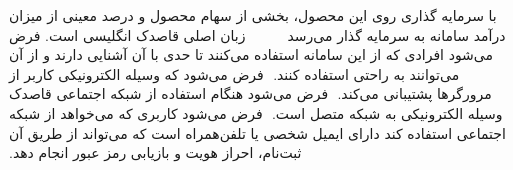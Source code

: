 ‫
‫  
‫ با سرمایه گذاری روی این محصول، بخشی از سهام محصول و درصد معینی از میزان درآمد سامانه به سرمایه گذار می‌رسد
‫
‫
‫
‫
‫
‫
‫
‫
‫ زبان اصلی قاصدک انگلیسی است. فرض می‌شود افرادی که از این سامانه استفاده می‌کنند تا حدی با آن آشنایی دارند و از آن می‌توانند به راحتی استفاده کنند.
‫
‫ فرض می‌شود که وسیله الکترونیکی کاربر از مرورگر‌ها پشتیبانی می‌کند.
‫
‫ فرض می‌شود هنگام استفاده از شبکه اجتماعی قاصدک وسیله الکترونیکی به شبکه متصل است.
‫
‫ فرض می‌شود کاربری که می‌خواهد از شبکه اجتماعی استفاده کند دارای ایمیل شخصی یا تلفن‌همراه است که می‌تواند از طریق آن ثبت‌نام، احراز هویت و بازیابی رمز عبور انجام دهد.
‫
‫
‫
‫
‫
‫
‫